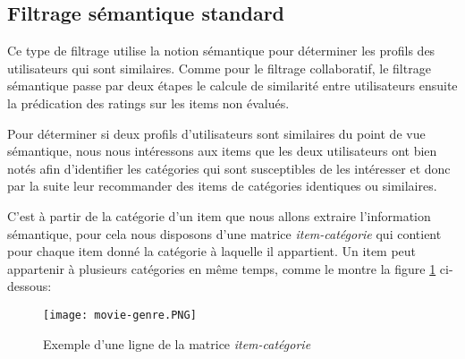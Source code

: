 \subsection{Filtrage sémantique standard}
Ce type de filtrage utilise la notion sémantique pour déterminer les profils des utilisateurs qui sont similaires. Comme pour le filtrage collaboratif, le filtrage sémantique passe par deux étapes le calcule de similarité entre utilisateurs ensuite la prédication des ratings sur les items non évalués.

Pour déterminer si deux profils d'utilisateurs sont similaires du point de vue sémantique, nous nous intéressons aux items que les deux utilisateurs ont bien notés afin d'identifier les catégories qui sont susceptibles de les intéresser et donc par la suite leur recommander des items de catégories identiques ou similaires. 

C'est à partir de la catégorie d'un item que nous allons extraire l'information sémantique, pour cela nous disposons d'une matrice \textit{item-catégorie} qui contient pour chaque item donné la catégorie à laquelle il appartient.
Un item peut appartenir à plusieurs catégories en même temps, comme le montre la figure \ref{fig:cat} ci-dessous:

\begin{figure}[H]
	\centering
	\texttt{[image: movie-genre.PNG]}
	\caption{Exemple d'une ligne de la matrice \textit{item-catégorie}}
	\label{fig:cat}
\end{figure}

